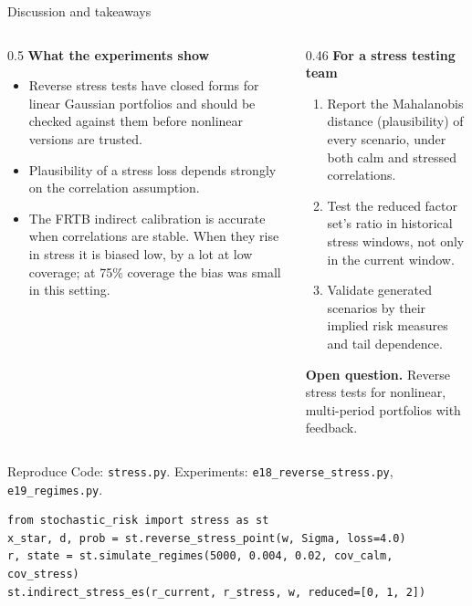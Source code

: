 \documentclass[aspectratio=169,10pt]{beamer}
\begin{document}
\begin{frame}{Discussion and takeaways}
  \small
  \begin{columns}[T]
    \begin{column}{0.5\textwidth}
      \textbf{What the experiments show}
      \begin{itemize}
        \item Reverse stress tests have closed forms for linear Gaussian portfolios and should be checked against them before nonlinear versions are trusted.
        \item Plausibility of a stress loss depends strongly on the correlation assumption.
        \item The FRTB indirect calibration is accurate when correlations are stable. When they rise in stress it is biased low, by a lot at low coverage; at 75\% coverage the bias was small in this setting.
      \end{itemize}
    \end{column}
    \begin{column}{0.46\textwidth}
      \textbf{For a stress testing team}
      \begin{enumerate}
        \item Report the Mahalanobis distance (plausibility) of every scenario, under both calm and stressed correlations.
        \item Test the reduced factor set's ratio in historical stress windows, not only in the current window.
        \item Validate generated scenarios by their implied risk measures and tail dependence.
      \end{enumerate}
      \textbf{Open question.} Reverse stress tests for nonlinear, multi-period portfolios with feedback.
    \end{column}
  \end{columns}
\end{frame}

\begin{frame}[fragile]{Reproduce}
  \small
  Code: \texttt{stress.py}. Experiments: \texttt{e18\_reverse\_stress.py}, \texttt{e19\_regimes.py}.
\begin{verbatim}
from stochastic_risk import stress as st
x_star, d, prob = st.reverse_stress_point(w, Sigma, loss=4.0)
r, state = st.simulate_regimes(5000, 0.004, 0.02, cov_calm, cov_stress)
st.indirect_stress_es(r_current, r_stress, w, reduced=[0, 1, 2])
\end{verbatim}
\end{frame}

\deckreferences
\end{document}
